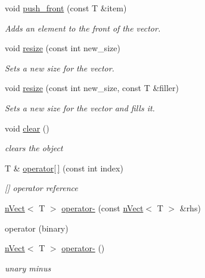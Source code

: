 \begin{DoxyCompactItemize}
void \hyperlink{classnVect_ae12cfca2171f96e7c792ae709745c298}{push\+\_\+front} (const T \&item)
\begin{DoxyCompactList}\small\item\em Adds an element to the front of the vector. \end{DoxyCompactList}\item 
void \hyperlink{classnVect_a5d998eac73178b38c0e24a6aa29eacbb}{resize} (const int new\+\_\+size)
\begin{DoxyCompactList}\small\item\em Sets a new size for the vector. \end{DoxyCompactList}\item 
void \hyperlink{classnVect_a58dcec4cc5ea9d8d18e03fb1671bee2b}{resize} (const int new\+\_\+size, const T \&filler)
\begin{DoxyCompactList}\small\item\em Sets a new size for the vector and fills it. \end{DoxyCompactList}\item 
void \hyperlink{classnVect_ad83c522fff7a545b02d20dbf2e99a4e7}{clear} ()
\begin{DoxyCompactList}\small\item\em clears the object \end{DoxyCompactList}\item 
T \& \hyperlink{classnVect_a3fb4c0900764f5b46c402639a1baf01f}{operator\mbox{[}$\,$\mbox{]}} (const int index)
\begin{DoxyCompactList}\small\item\em \mbox{[}\mbox{]} operator reference \end{DoxyCompactList}\item 
\hyperlink{classnVect}{n\+Vect}$<$ T $>$ \hyperlink{classnVect_a2941f0e337b1c7348e8b479539ea715c}{operator-\/} (const \hyperlink{classnVect}{n\+Vect}$<$ T $>$ \&rhs)
\begin{DoxyCompactList}\small\item\em 
\begin{DoxyItemize}
\item operator (binary) 
\end{DoxyItemize}\end{DoxyCompactList}\item 
\hyperlink{classnVect}{n\+Vect}$<$ T $>$ \hyperlink{classnVect_a24677bbe43b1a1f5d77b36e7b96bcb98}{operator-\/} ()
\begin{DoxyCompactList}\small\item\em unary minus \end{DoxyCompactList}\item 

\end{DoxyCompactItemize}
